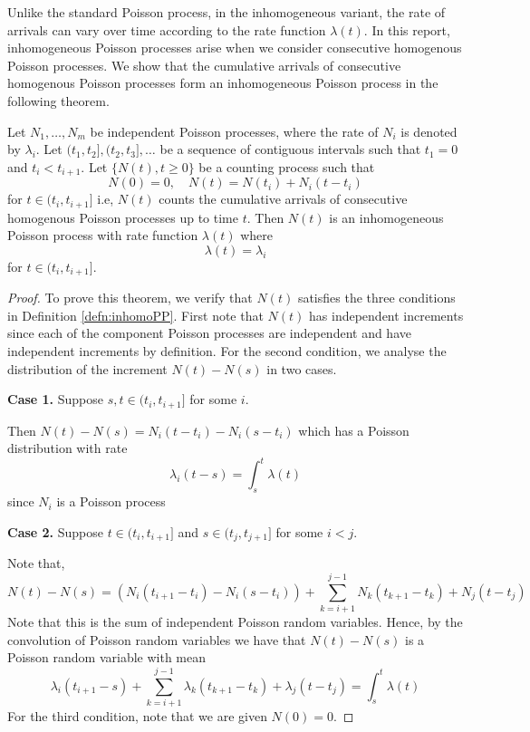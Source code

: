 Unlike the standard Poisson process, in the inhomogeneous variant, the rate of arrivals can vary over time according to the rate function $\lambda(t)$. In this report, inhomogeneous Poisson processes arise when we consider consecutive homogenous Poisson processes. We show that the cumulative arrivals of consecutive homogenous Poisson processes form an inhomogeneous Poisson process in the following theorem.

\begin{theorem}
	Let $N_1, \dots, N_m$ be independent Poisson processes, where the rate of $N_i$ is denoted by $\lambda_i$. Let $(t_1, t_2], (t_2, t_3], \dots$ be a sequence of contiguous intervals such that $t_1 = 0$ and $t_i < t_{i+1}$. Let $\{N(t), t \geq 0\}$ be a counting process such that
	$$
		N(0) = 0, \quad N(t) = N(t_i) + N_i(t - t_i)
	$$ 
	for $t \in (t_i, t_{i+1}]$ i.e, $N(t)$ counts the cumulative arrivals of consecutive homogenous Poisson processes up to time $t$. Then $N(t)$ is an inhomogeneous Poisson process with rate function $\lambda(t)$ where
	$$
		\lambda(t) = \lambda_i
	$$
	for $t \in (t_i, t_{i+1}]$.
\end{theorem}

\begin{proof}
	To prove this theorem, we verify that $N(t)$ satisfies the three conditions in Definition \ref{defn:inhomoPP}. First note that $N(t)$ has independent increments since each of the component Poisson processes are independent and have independent increments by definition. For the second condition, we analyse the distribution of the increment $N(t) - N(s)$ in two cases.

	\textbf{Case 1.} Suppose $s, t \in (t_i, t_{i+1}]$ for some $i$. 
	
	\noindent
	Then $N(t) - N(s) = N_i(t - t_i) - N_i(s - t_i)$ which has a Poisson distribution with rate $$
		\lambda_i(t-s) = \int_s^t \lambda(t)
	$$
	since $N_i$ is a Poisson process

	\textbf{Case 2.} Suppose $t \in (t_i, t_{i+1}]$ and $s \in (t_j, t_{j+1}]$ for some $i < j$.
	
	\noindent
	Note that, 
	$$
		N(t) - N(s) = (N_i(t_{i+1} - t_i) - N_i(s - t_i)) + \sum_{k=i+1}^{j-1} N_k(t_{k+1} - t_k) + N_j(t - t_j)
	$$
	Note that this is the sum of independent Poisson random variables. Hence, by the convolution of Poisson random variables we have that $N(t) - N(s)$ is a Poisson random variable with mean
	$$
		\lambda_i(t_{i+1} - s) + \sum_{k=i+1}^{j-1} \lambda_k(t_{k+1} - t_k) + \lambda_j(t - t_j) = \int_s^t \lambda(t) 
	$$
	For the third condition, note that we are given $N(0) = 0$.
\end{proof}

